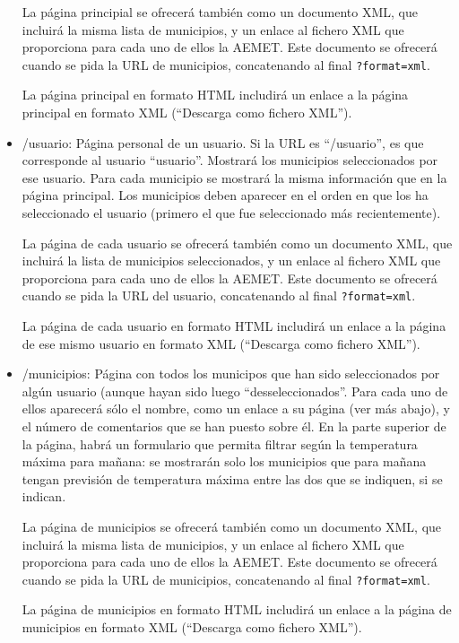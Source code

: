 \begin{itemize}
  La página principial se ofrecerá también como un documento XML, que incluirá la misma lista de municipios, y un enlace al fichero XML que proporciona para cada uno de ellos la AEMET. Este documento se ofrecerá cuando se pida la URL de municipios, concatenando al final \verb|?format=xml|.

  La página principal en formato HTML includirá un enlace a la página principal en formato XML (``Descarga como fichero XML'').
  
  \item /{usuario}: Página personal de un usuario. Si la URL es ``/usuario'', es que corresponde al usuario ``usuario''. Mostrará los municipios seleccionados por ese usuario. Para cada municipio se mostrará la misma información que en la página principal. Los municipios deben aparecer en el orden en que los ha seleccionado el usuario (primero el que fue seleccionado más recientemente).

  La página de cada usuario se ofrecerá también como un documento XML, que incluirá la lista de municipios seleccionados, y un enlace al fichero XML que proporciona para cada uno de ellos la AEMET. Este documento se ofrecerá cuando se pida la URL del usuario, concatenando al final \verb|?format=xml|.

  La página de cada usuario en formato HTML includirá un enlace a la página de ese mismo usuario en formato XML (``Descarga como fichero XML'').

  \item /municipios: Página con todos los municipos que han sido seleccionados por algún usuario (aunque hayan sido luego ``desseleccionados''. Para cada uno de ellos aparecerá sólo el nombre, como un enlace a su página (ver más abajo), y el número de comentarios que se han puesto sobre él. En la parte superior de la página, habrá un formulario que permita filtrar según la temperatura máxima para mañana: se mostrarán solo los municipios que para mañana tengan previsión de temperatura máxima entre las dos que se indiquen, si se indican.

    La página de municipios se ofrecerá también como un documento XML, que incluirá la misma lista de municipios, y un enlace al fichero XML que proporciona para cada uno de ellos la AEMET. Este documento se ofrecerá cuando se pida la URL de municipios, concatenando al final \verb|?format=xml|.

    La página de municipios en formato HTML includirá un enlace a la página de municipios en formato XML (``Descarga como fichero XML'').


\end{itemize}
